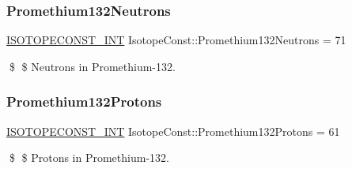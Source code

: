 \subsubsection{\texorpdfstring{Promethium132\+Neutrons}{Promethium132Neutrons}}
{\footnotesize\ttfamily \mbox{\hyperlink{group___isotope_const-_macros_ga5f18360b3e99483a35c32d789e62621c}{I\+S\+O\+T\+O\+P\+E\+C\+O\+N\+S\+T\+\_\+\+I\+NT}} Isotope\+Const\+::\+Promethium132\+Neutrons = 71}

\$ \$ Neutrons in Promethium-\/132. \mbox{\label{group___isotope_const-_promethium-_pm132_ga03c6bcd6d0a9ab53d6c83a870ca3c40b}} 
\subsubsection{\texorpdfstring{Promethium132\+Protons}{Promethium132Protons}}
{\footnotesize\ttfamily \mbox{\hyperlink{group___isotope_const-_macros_ga5f18360b3e99483a35c32d789e62621c}{I\+S\+O\+T\+O\+P\+E\+C\+O\+N\+S\+T\+\_\+\+I\+NT}} Isotope\+Const\+::\+Promethium132\+Protons = 61}

\$ \$ Protons in Promethium-\/132. 